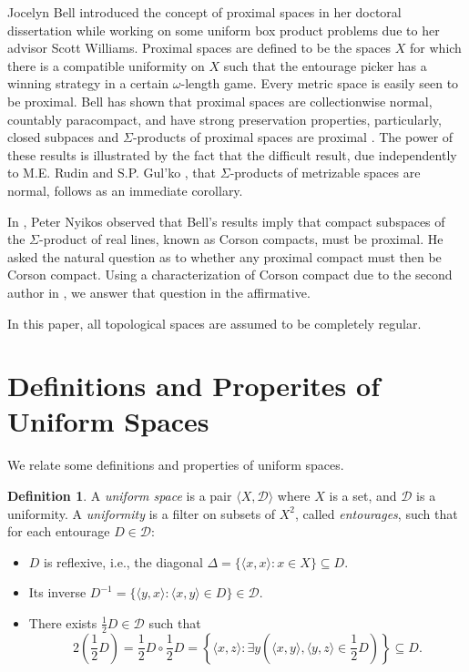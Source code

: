 \documentclass{amsart}
\theoremstyle{definition}
\newtheorem{defn}[thm]{Definition}
\theoremstyle{remark}
\newcommand{\mc}{\mathcal}
\newcommand{\<}{\langle}
\renewcommand{\>}{\rangle}
\newcommand{\term}{\textit}
\begin{document}
Jocelyn Bell introduced the concept of proximal spaces in her doctoral dissertation while working on some uniform box product problems due to her advisor Scott Williams.  Proximal spaces are defined to be the spaces $X$ for which there is a compatible uniformity on $X$ such that the entourage picker has a winning strategy in a certain $\omega$-length game. Every metric space is easily seen to be proximal. Bell has shown that proximal spaces are collectionwise normal, countably paracompact, and have strong preservation properties, particularly, closed subpaces and  $\Sigma$-products of proximal spaces are  proximal \cite{b}.  The power of these results is illustrated by the fact that the difficult result, due independently to M.E. Rudin \cite{ru} and S.P. Gul'ko \cite{gu}, that $\Sigma$-products of metrizable spaces are normal, follows as an immediate corollary.

In \cite{nproximal}, Peter Nyikos observed that Bell's results imply that compact subspaces of the $\Sigma$-product of real lines, known as Corson compacts, must be proximal. He asked the natural question as to whether any proximal compact must then be Corson compact. Using a characterization of Corson compact due to the second author in \cite{gcovering}, we  answer that question in the affirmative.


In this paper, all topological spaces are assumed to be completely regular.

\section{Definitions and Properites of Uniform Spaces}
 We relate some definitions and properties of uniform spaces.

\begin{defn}
  A \term{uniform space} is a pair $\<X,\mc{D}\>$ where $X$ is a set, and $\mc{D}$ is a uniformity. A \term{uniformity} is a filter on subsets of $X^2$, called \term{entourages}, such that for each entourage $D\in \mc D$:
  \begin{itemize}
      \item $D$ is reflexive, i.e., the diagonal $\Delta=\{\<x,x\>:x\in X\}\subseteq D$.
      \item Its inverse $D^{-1}=\{\<y,x\>:\<x,y\>\in D\}\in \mc D$.
      \item There exists $\frac{1}{2}D\in\mc D$ such that
        \[
          2\left(\frac{1}{2}D\right)=\frac{1}{2}D\circ \frac{1}{2}D=\left\{\<x,z\>:\exists y\left(\<x,y\>,\<y,z\>\in \frac{1}{2}D\right)\right\}\subseteq D.
        \]
    \end{itemize}
\end{defn}
\end{document}
